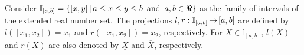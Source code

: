\documentclass[12pt]{article}
\theoremstyle{plain}
\theoremstyle{remark}
\theoremstyle{definition}
\theoremstyle{proposition}
\newcommand{\II}{\mathbb{I} }
\begin{document}
%

Consider $\II_{[a,b]} = \{[x,y] \, | \, a\leq x\leq y\leq b \mbox{\, and \,} a,b \in \Re\}$ as the family of intervals  of the extended real number set. The projections $l,r:\mathbb{I}_{[a,b]}\hspace{-0.05cm}\rightarrow\hspace{-0.05cm} [a,b]$ are defined by $l([x_1,x_2])=x_1$ and $r([x_1,x_2])=x_2$,
respectively. For $X\in \mathbb{I}_{[a,b]}$,  $l(X)$ and $r(X)$ are also denoted by $\underline{X}$ and $\overline{X}$,
respectively.  
\end{document}
